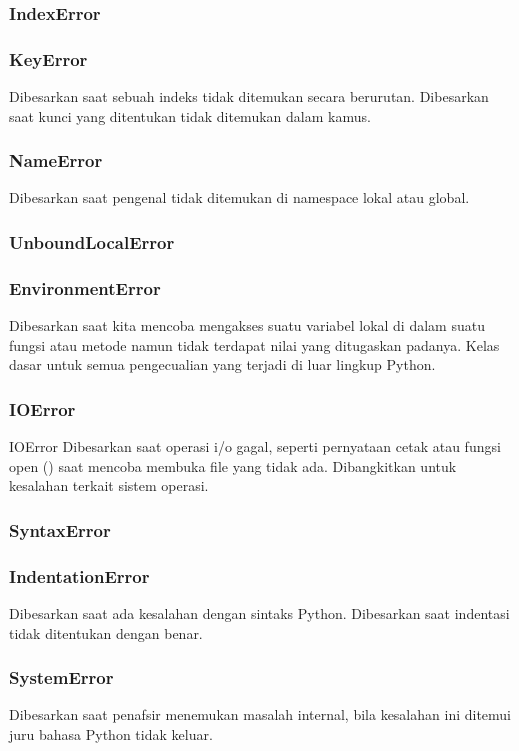 \subsubsection{IndexError}

\subsubsection{KeyError}
Dibesarkan saat sebuah indeks tidak ditemukan secara berurutan. Dibesarkan saat kunci yang ditentukan tidak ditemukan dalam kamus.

\subsubsection{NameError}
Dibesarkan saat pengenal tidak ditemukan di namespace lokal atau global.

\subsubsection{UnboundLocalError}

\subsubsection{EnvironmentError}
Dibesarkan saat kita mencoba mengakses suatu variabel lokal di dalam suatu fungsi atau metode namun tidak terdapat nilai yang ditugaskan padanya. Kelas dasar untuk semua pengecualian yang terjadi di luar lingkup Python.

\subsubsection{IOError}
IOError Dibesarkan saat operasi i/o gagal, seperti pernyataan cetak atau fungsi open () saat mencoba membuka file yang tidak ada. Dibangkitkan untuk kesalahan terkait sistem operasi.

\subsubsection{SyntaxError} 

\subsubsection{IndentationError}
Dibesarkan saat ada kesalahan dengan sintaks Python.
Dibesarkan saat indentasi tidak ditentukan dengan benar. 

\subsubsection{SystemError} 
Dibesarkan saat penafsir menemukan masalah internal, bila kesalahan ini ditemui juru bahasa Python tidak keluar.
